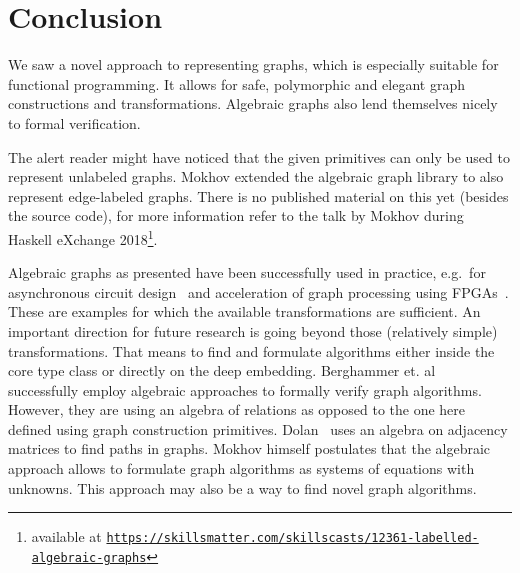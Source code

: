 \documentclass{article}
\begin{document}
\section{Conclusion}\label{sec:conclusion}
We saw a novel approach to representing graphs, which is especially suitable for
functional programming. It allows for safe, polymorphic and elegant graph
constructions and transformations. Algebraic graphs also lend themselves nicely
to formal verification.

The alert reader might have noticed that the given primitives can only be used
to represent unlabeled graphs. Mokhov extended the algebraic graph library to
also represent edge-labeled graphs. There is no published material on this yet
(besides the source code), for more information refer to the talk by Mokhov
during Haskell eXchange 2018\footnote{available at
  \texttt{\href{https://skillsmatter.com/skillscasts/12361-labelled-algebraic-graphs}{https://skillsmatter.com/skillscasts/12361-labelled-algebraic-graphs}}}.

Algebraic graphs as presented have been successfully used in practice, e.g.\ for
asynchronous circuit design~\cite{beaumont2017high} and acceleration of graph
processing using FPGAs~\cite{mokhov2019language}. These are examples for which
the available transformations are sufficient. An important direction for future
research is going beyond those (relatively simple) transformations. That means
to find and formulate algorithms either inside the core type class or directly
on the deep embedding. Berghammer et. al~\cite{berghammer2020relational}
successfully employ algebraic approaches to formally verify graph algorithms.
However, they are using an algebra of relations as opposed to the one here
defined using graph construction primitives. Dolan~\cite{dolan2013fun} uses an
algebra on adjacency matrices to find paths in graphs.
Mokhov himself postulates that the algebraic approach allows to formulate graph
algorithms as systems of equations with unknowns. This approach may also be a
way to find novel graph algorithms.

\printbibliography
\end{document}
